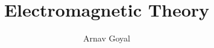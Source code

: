

\title{Electromagnetic Theory}
\author{Arnav Goyal}

\def\myreferences{
\item Fundamentals of Applied Electromagnetics - 7e - T. Ulaby, U.Ravaioli
}


	\maketitle
	\preface

